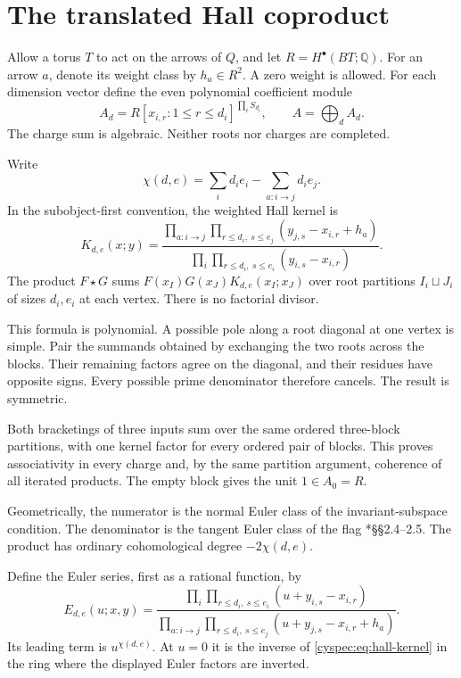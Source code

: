 \section{The translated Hall coproduct}
\label{cyspec:sec:polynomial-coproduct}

Allow a torus $T$ to act on the arrows of $Q$, and let
$R=H^\bullet(BT;\mathbb Q)$. For an arrow $a$, denote its weight
class by $h_a\in R^2$. A zero weight is allowed.
For each dimension vector define the even polynomial coefficient
module
\[
 A_d=R[x_{i,r}:1\leq r\leq d_i]^{\prod_i S_{d_i}},
 \qquad A=\bigoplus_d A_d.
\]
The charge sum is algebraic. Neither roots nor charges are completed.

Write
\[
 \chi(d,e)=\sum_i d_i e_i-\sum_{a:i\to j}d_i e_j.
\]
In the subobject-first convention, the weighted Hall kernel is
\begin{equation}\label{cyspec:eq:hall-kernel}
 K_{d,e}(x;y)=
 \frac{\displaystyle\prod_{a:i\to j}
                \prod_{r\leq d_i,\ s\leq e_j}(y_{j,s}-x_{i,r}+h_a)}
      {\displaystyle\prod_i
                \prod_{r\leq d_i,\ s\leq e_i}(y_{i,s}-x_{i,r})}.
\end{equation}
The product $F\star G$ sums $F(x_I)G(x_J)K_{d,e}(x_I;x_J)$
over root partitions $I_i\sqcup J_i$ of sizes $d_i,e_i$ at each
vertex. There is no factorial divisor.

This formula is polynomial. A possible pole along a root diagonal
at one vertex is simple. Pair the summands obtained by exchanging
the two roots across the blocks. Their remaining factors agree on
the diagonal, and their residues have opposite signs. Every possible
prime denominator therefore cancels. The result is symmetric.

Both bracketings of three inputs sum over the same ordered
three-block partitions, with one kernel factor for every ordered
pair of blocks. This proves associativity in every charge and,
by the same partition argument, coherence of all iterated products.
The empty block gives the unit $1\in A_0=R$.

Geometrically, the numerator is the normal Euler class of the
invariant-subspace condition. The denominator is the tangent
Euler class of the flag \cite{cyspec:KS}*{\S\S2.4--2.5}.
The product has ordinary cohomological degree $-2\chi(d,e)$.

Define the Euler series, first as a rational function, by
\begin{equation}\label{cyspec:eq:spectral-euler}
 E_{d,e}(u;x,y)=
 \frac{\displaystyle\prod_i\prod_{r\leq d_i,\ s\leq e_i}
                                  (u+y_{i,s}-x_{i,r})}
      {\displaystyle\prod_{a:i\to j}\prod_{r\leq d_i,\ s\leq e_j}
                                  (u+y_{j,s}-x_{i,r}+h_a)}.
\end{equation}
Its leading term is $u^{\chi(d,e)}$.
At $u=0$ it is the inverse of \eqref{cyspec:eq:hall-kernel} in the
ring where the displayed Euler factors are inverted.

